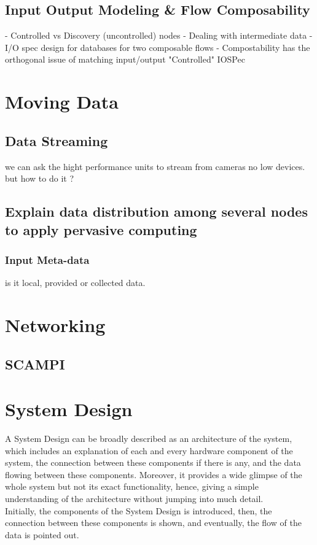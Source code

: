 \subsection{Input Output Modeling \& Flow Composability}
- Controlled vs Discovery (uncontrolled) nodes 
- Dealing with intermediate data
- I/O spec design for databases for two composable flows
- Compostability has the orthogonal issue of matching input/output "Controlled" IOSPec


\section{Moving Data}

\subsection{Data Streaming}
we can ask the hight performance units to stream from cameras no low devices. but how to do it ?

\subsection{Explain data distribution among several nodes to apply pervasive computing}

\subsubsection{Input Meta-data}
is it local, provided or collected data.

\section{Networking}

\subsection{SCAMPI }

\section{System Design }
A System Design can be broadly described as an architecture of the system, which includes an explanation of each and every hardware component of the system, the connection between these components if there is any, and the data flowing between these components. Moreover, it provides a wide glimpse of the whole system but not its exact functionality, hence, giving a simple understanding of the architecture without jumping into much detail.\\
Initially, the components of the System Design is introduced, then, the connection between these components is shown, and eventually, the flow of the data is pointed out.

